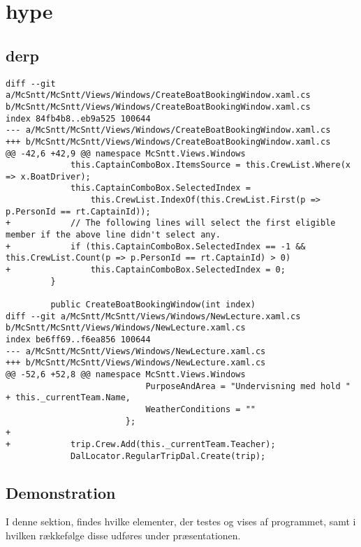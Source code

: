 \documentclass[a4paper,11pt,fleqn,twoside,openright,final]{memoir}
\begin{document}
\sloppy


\chapter{hype}
\section{derp}
\begin{lstlisting}[frame=single, caption=Forsidens Code-Behind, label=fntpg-cb]
diff --git a/McSntt/McSntt/Views/Windows/CreateBoatBookingWindow.xaml.cs b/McSntt/McSntt/Views/Windows/CreateBoatBookingWindow.xaml.cs
index 84fb4b8..eb9a525 100644
--- a/McSntt/McSntt/Views/Windows/CreateBoatBookingWindow.xaml.cs
+++ b/McSntt/McSntt/Views/Windows/CreateBoatBookingWindow.xaml.cs
@@ -42,6 +42,9 @@ namespace McSntt.Views.Windows
             this.CaptainComboBox.ItemsSource = this.CrewList.Where(x => x.BoatDriver);
             this.CaptainComboBox.SelectedIndex =
                 this.CrewList.IndexOf(this.CrewList.First(p => p.PersonId == rt.CaptainId));
+            // The following lines will select the first eligible member if the above line didn't select any.
+            if (this.CaptainComboBox.SelectedIndex == -1 && this.CrewList.Count(p => p.PersonId == rt.CaptainId) > 0) 
+                this.CaptainComboBox.SelectedIndex = 0;
         }
 
         public CreateBoatBookingWindow(int index)
diff --git a/McSntt/McSntt/Views/Windows/NewLecture.xaml.cs b/McSntt/McSntt/Views/Windows/NewLecture.xaml.cs
index be6ff69..f6ea856 100644
--- a/McSntt/McSntt/Views/Windows/NewLecture.xaml.cs
+++ b/McSntt/McSntt/Views/Windows/NewLecture.xaml.cs
@@ -52,6 +52,8 @@ namespace McSntt.Views.Windows
                            PurposeAndArea = "Undervisning med hold " + this._currentTeam.Name,
                            WeatherConditions = ""
                        };
+
+            trip.Crew.Add(this._currentTeam.Teacher);
             DalLocator.RegularTripDal.Create(trip);
\end{lstlisting}

\section{Demonstration}

I denne sektion, findes hvilke elementer, der testes og vises af programmet, samt i hvilken rækkefølge disse udføres under præsentationen.
\end{document}
